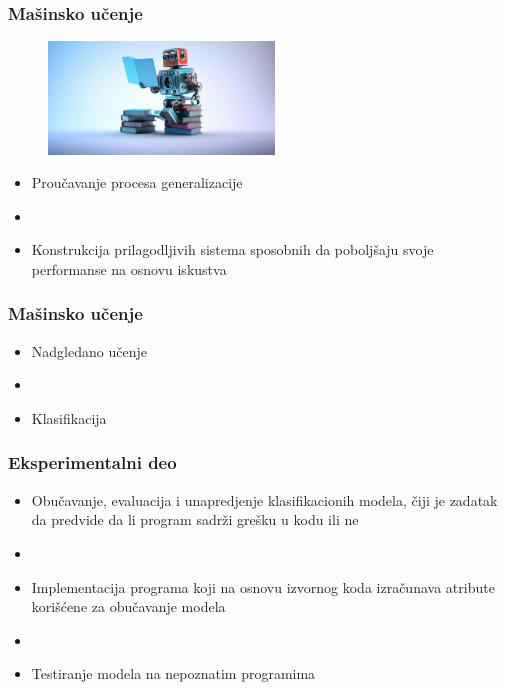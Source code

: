 \documentclass[14pt]{beamer}
\begin{document}
\begin{frame}
\frametitle{Mašinsko učenje}

\begin{figure}
\includegraphics[width=0.5\linewidth, height=3cm]{machine-learning}
\end{figure}

\begin{itemize}
\item Proučavanje procesa generalizacije 
\item[]
\item Konstrukcija prilagodljivih sistema sposobnih da poboljšaju svoje performanse na osnovu iskustva
\end{itemize}

\end{frame}


\begin{frame}
\frametitle{Mašinsko učenje}

\begin{itemize}
\item Nadgledano učenje
\item[]
\item Klasifikacija
\end{itemize}

\end{frame}


\begin{frame}
\frametitle{Eksperimentalni deo}

\begin{itemize}
\item Obučavanje, evaluacija i unapredjenje klasifikacionih modela, čiji je zadatak da predvide da li program sadrži grešku u kodu ili ne
\item[]
\item Implementacija programa koji na osnovu izvornog koda izračunava atribute korišćene za obučavanje modela
\item[]
\item Testiranje modela na nepoznatim programima
\end{itemize}

\end{frame}
\end{document}
